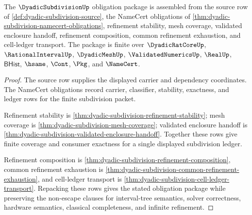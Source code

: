 \begin{theorem}
\label{thm:dyadic-subdivision-namecert-package}
The $\DyadicSubdivisionUp$ obligation package is assembled from the source row of \autoref{def:dyadic-subdivision-source}, the NameCert obligations of \autoref{thm:dyadic-subdivision-namecert-obligations}, refinement stability, mesh coverage, validated enclosure handoff, refinement composition, common refinement exhaustion, and cell-ledger transport. The package is finite over $\DyadicRatCoreUp$, $\RationalIntervalUp$, $\DyadicMeshUp$, $\ValidatedNumericsUp$, $\RealUp$, $\mathsf{BHist}$, $\hsame$, $\Cont$, $\Pkg$, and $\NameCert$.
\end{theorem}
\begin{proof}
The source row supplies the displayed carrier and dependency coordinates. The NameCert obligations record carrier, classifier, stability, exactness, and ledger rows for the finite subdivision packet.

Refinement stability is \autoref{thm:dyadic-subdivision-refinement-stability}; mesh coverage is \autoref{thm:dyadic-subdivision-mesh-coverage}; validated enclosure handoff is \autoref{thm:dyadic-subdivision-validated-enclosure-handoff}. Together these rows give finite coverage and consumer exactness for a single displayed subdivision ledger.

Refinement composition is \autoref{thm:dyadic-subdivision-refinement-composition}, common refinement exhaustion is \autoref{thm:dyadic-subdivision-common-refinement-exhaustion}, and cell-ledger transport is \autoref{thm:dyadic-subdivision-cell-ledger-transport}. Repacking these rows gives the stated obligation package while preserving the non-escape clauses for interval-tree semantics, solver correctness, hardware semantics, classical completeness, and infinite refinement.
\end{proof}

